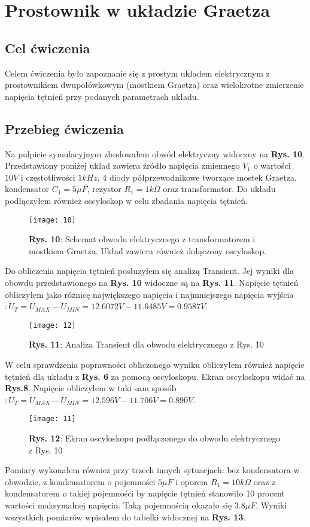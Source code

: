 \documentclass[11pt]{article}
\begin{document}
\section{Prostownik w układzie Graetza}
\subsection{Cel ćwiczenia}
Celem ćwiczenia było zapoznanie się z prostym układem elektrycznym z prostownikiem dwupołówkowym (mostkiem Graetza) oraz wielokrotne zmierzenie napięcia tętnień przy podanych parametrach układu.
\subsection{Przebieg ćwiczenia}
Na pulpicie symulacyjnym zbudowałem obwód elektryczny widoczny na \textbf{Rys. 10}. Przedstawiony poniżej układ zawiera źródło napięcia zmiennego  $V_1$ o wartości $10V$ i częstotliwości $1kHz$, 4 diody półprzewodnikowe tworzące mostek Graetza, kondensator $C_1 = 5\mu$$F$, rezystor $R_1 = 1k\Omega$ oraz transformator. Do układu podłączyłem również oscyloskop w celu zbadania napięcia tętnień.
\begin{figure}[H]
\centering
\texttt{[image: 10]}
\caption*{\textbf{Rys. 10}: Schemat obwodu elektrycznego z transformatorem i mostkiem Graetza. Układ zawiera również dołączony oscyloskop.}
\end{figure}
\noindent Do obliczenia napięcia tętnień posłuzyłem się analizą Transient. Jej wyniki dla obowdu przedstawionego na \textbf{Rys. 10} widoczne są na \textbf{Rys. 11}. Napięcie tętnień obliczyłem jako różnicę największego napięcia i najmniejszego napięcia wyjścia$: U_T = U_{MAX} - U_{MIN} = 12.6072 V - 11.6485 V = 0.9587 V $.
\begin{figure}[H]
\centering
\texttt{[image: 12]}
\caption*{\textbf{Rys. 11}: Analiza Transient dla obwodu elektrycznego z Rys. 10}
\end{figure}
\noindent W celu sprawdzenia poprawności obliczonego wyniku obliczyłem również napięcie tętnień dla układu z \textbf{Rys. 6} za pomocą oscyloskopu. Ekran oscyloskopu widać na \textbf{Rys.8}. Napięcie obliczyłem w taki sam sposób$: U_T = U_{MAX} - U_{MIN} = 12.596 V - 11.706 V =  0.890 V$.
\begin{figure}[H]
\centering
\texttt{[image: 11]}
\caption*{\textbf{Rys. 12}: Ekran oscyloskopu podłączonego do obwodu elektrycznego z Rys. 10}
\end{figure}
\noindent Pomiary wykonałem również przy trzech innych sytuacjach: bez kondensatora w obwodzie, z kondensatorem o pojemności $5\mu$$F$ i oporem $R_1 = 10k\Omega$ oraz z kondensatorem o takiej pojemności by napięcie tętnień stanowiło 10 procent wartości maksymalnej napięcia. Taką pojemnością okazało się $3.8\mu$$F$. Wyniki wszystkich pomiarów wpisałem do tabelki widocznej na \textbf{Rys. 13}.
$$
\end{document}
